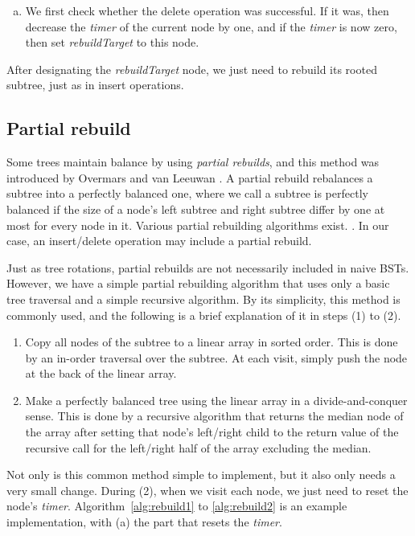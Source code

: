 \documentclass{article}
\begin{document}
\begin{enumerate}[(a)]
 \item We first check whether the delete operation was successful. If it was, then decrease the \emph{timer} of the current node by one, and if the \emph{timer} is now zero, then set \emph{rebuildTarget} to this node.
\end{enumerate}

After designating the \emph{rebuildTarget} node, we just need to rebuild its rooted subtree, just as in insert operations.

\subsection {Partial rebuild}
\label{sec:rebuild}
Some trees maintain balance by using \emph{partial rebuilds}, and this method was introduced by Overmars and van Leeuwan \cite{Overmars:1987:DDD:535500, Overmars:1982:DMD:2697726.2697937}. A partial rebuild rebalances a subtree into a perfectly balanced one, where we call a subtree is perfectly balanced if the size of a node's left subtree and right subtree differ by one at most for every node in it. Various partial rebuilding algorithms exist. \cite{BentleyMultiBST, Chang84, Martin72, Stout86}. In our case, an insert/delete operation may include a partial rebuild.

Just as tree rotations, partial rebuilds are not necessarily included in naive BSTs. However, we have a simple partial rebuilding algorithm that uses only a basic tree traversal and a simple recursive algorithm. By its simplicity, this method is commonly used, and the following is a brief explanation of it in steps (1) to (2).
\begin{enumerate}[(1)]
 \item Copy all nodes of the subtree to a linear array in sorted order. This is done by an in-order traversal over the subtree. At each visit, simply push the node at the back of the linear array.
 \item Make a perfectly balanced tree using the linear array in a divide-and-conquer sense. This is done by a recursive algorithm that returns the median node of the array after setting that node's left/right child to the return value of the recursive call for the left/right half of the array excluding the median.
\end{enumerate}

Not only is this common method simple to implement, but it also only needs a very small change. During (2), when we visit each node, we just need to reset the node's \emph{timer}. Algorithm~\ref{alg:rebuild1} to \ref{alg:rebuild2} is an example implementation, with (a) the part that resets the \emph{timer}.
\end{document}
